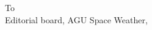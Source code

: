\documentclass{letter}
\begin{document}
To \\
Editorial board, AGU Space Weather,\\

\hfill
\end{document}
